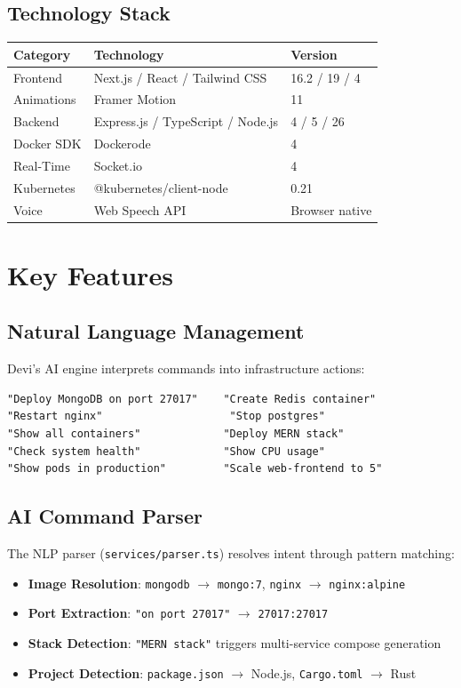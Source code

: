 \documentclass[12pt,a4paper]{report}
\begin{document}
\section{Technology Stack}
\begin{table}[H]
\centering
\small
\begin{tabularx}{\textwidth}{l l l}
\toprule
\textbf{Category} & \textbf{Technology} & \textbf{Version} \\
\midrule
Frontend & Next.js / React / Tailwind CSS & 16.2 / 19 / 4 \\
Animations & Framer Motion & 11 \\
Backend & Express.js / TypeScript / Node.js & 4 / 5 / 26 \\
Docker SDK & Dockerode & 4 \\
Real-Time & Socket.io & 4 \\
Kubernetes & @kubernetes/client-node & 0.21 \\
Voice & Web Speech API & Browser native \\
\bottomrule
\end{tabularx}
\end{table}

\chapter{Key Features}

\section{Natural Language Management}
Devi's AI engine interprets commands into infrastructure actions:
\begin{lstlisting}
"Deploy MongoDB on port 27017"    "Create Redis container"
"Restart nginx"                    "Stop postgres"
"Show all containers"             "Deploy MERN stack"
"Check system health"             "Show CPU usage"
"Show pods in production"         "Scale web-frontend to 5"
\end{lstlisting}

\section{AI Command Parser}
The NLP parser (\texttt{services/parser.ts}) resolves intent through pattern matching:
\begin{itemize}
  \item \textbf{Image Resolution}: \texttt{mongodb} $\rightarrow$ \texttt{mongo:7}, \texttt{nginx} $\rightarrow$ \texttt{nginx:alpine}
  \item \textbf{Port Extraction}: \texttt{"on port 27017"} $\rightarrow$ \texttt{27017:27017}
  \item \textbf{Stack Detection}: \texttt{"MERN stack"} triggers multi-service compose generation
  \item \textbf{Project Detection}: \texttt{package.json} $\rightarrow$ Node.js, \texttt{Cargo.toml} $\rightarrow$ Rust
\end{itemize}
\end{document}
